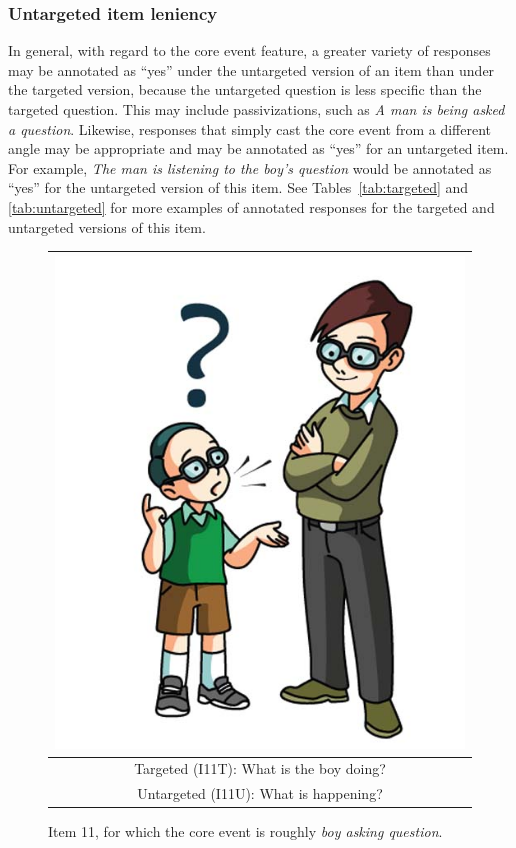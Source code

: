 \documentclass[12pt,notitlepage]{article}
\begin{document}
\subsubsection{Untargeted item leniency} In general, with regard to the core event feature, a greater variety of responses may be annotated as ``yes'' under the untargeted version of an item than under the targeted version, because the untargeted question is less specific than the targeted question. This may include passivizations, such as \textit{A man is being asked a question}. Likewise, responses that simply cast the core event from a different angle may be appropriate and may be annotated as ``yes'' for an untargeted item. For example, \textit{The man is listening to the boy's question} would be annotated as ``yes'' for the untargeted version of this item. See Tables~\ref{tab:targeted} and \ref{tab:untargeted} for more examples of annotated responses for the targeted and untargeted versions of this item.
\begin{figure}[h]
\begin{center}
\begin{tabular}{|c|}
\hline
\includegraphics[width=0.4\columnwidth,trim=0 0 0 -3]{figures/I11.jpg}\\
\hline
Targeted (I11T): What is the boy doing?\\
\hline
Untargeted (I11U): What is happening? \\
\hline
\end{tabular}
\end{center}
\caption{Item 11, for which the core event is roughly \textit{boy asking question}.}
\label{fig:ask-question}
\end{figure}

\newpage
\end{document}
